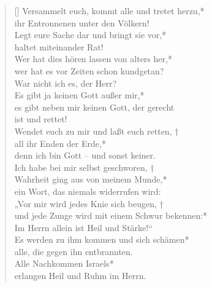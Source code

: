 \begin{verse}[\versewidth]
Versammelt euch, kommt alle und tretet herzu,*\\
ihr Entronnenen unter den Völkern!\\
\vin Legt eure Sache dar und bringt sie vor,*\\
\vin haltet miteinander Rat!\\
Wer hat dies hören lassen von alters her,*\\
wer hat es vor Zeiten schon kundgetan?\\
\vin War nicht ich es, der Herr?\\
\vin Es gibt ja keinen Gott außer mir,*\\
\vin es gibt neben mir keinen Gott, der gerecht\\
\vin ist und rettet!\\
Wendet euch zu mir und laßt euch retten, †\\
all ihr Enden der Erde,*\\
denn ich bin Gott – und sonst keiner.\\
\vin Ich habe bei mir selbst geschworen, †\\
\vin Wahrheit ging aus von meinem Munde,*\\
\vin ein Wort, das niemals widerrufen wird:\\
„Vor mir wird jedes Knie sich beugen, †\\
und jede Zunge wird mit einem Schwur bekennen:*\\
Im Herrn allein ist Heil und Stärke!“\\

\vin Es werden zu ihm kommen und sich schämen*\\
\vin alle, die gegen ihn entbrannten.\\
Alle Nachkommen Israels*\\
erlangen Heil und Ruhm im Herrn.\\

\end{verse}


\def\greinitialformat#1{{\fontsize{40}{40}\selectfont #1}}
\gresetfirstlineaboveinitial{\small \textcolor{red}{Hab 3}}{}
\setaboveinitialseparation{0.72mm}

\newpage

